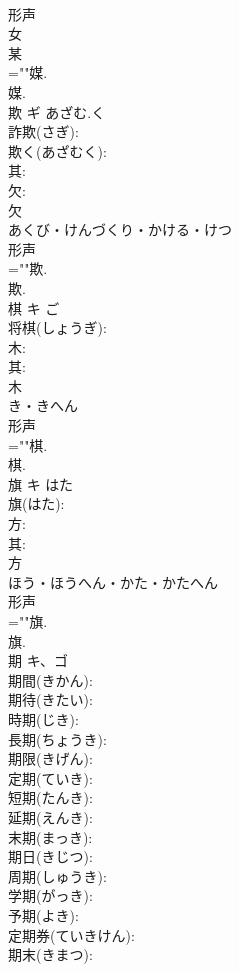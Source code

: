 \documentclass[8pt]{extreport}
\begin{document}
\begin{CJK}{UTF8}{min}
\\	形声 
\\	女 
\\	某
\\	=""媒.
\\	媒.
\\	欺	ギ	あざむ.く		
\\	詐欺(さぎ): 
\\	欺く(あざむく): 
\\	其: 
\\	欠: 
\\	欠	
\\	あくび・けんづくり・かける・けつ	
\\	形声 
\\	=""欺.
\\	欺.
\\	棋	キ	ご		
\\	将棋(しょうぎ): 
\\	木: 
\\	其: 
\\	木	
\\	き・きへん	
\\	形声 
\\	=""棋.
\\	棋.
\\	旗	キ	はた		
\\	旗(はた): 
\\	方: 
\\	其: 
\\	方	
\\	ほう・ほうへん・かた・かたへん	
\\	形声 
\\	=""旗.
\\	旗.
\\	期	キ、ゴ			
\\	期間(きかん): 
\\	期待(きたい): 
\\	時期(じき): 
\\	長期(ちょうき): 
\\	期限(きげん): 
\\	定期(ていき): 
\\	短期(たんき): 
\\	延期(えんき): 
\\	末期(まっき): 
\\	期日(きじつ): 
\\	周期(しゅうき): 
\\	学期(がっき): 
\\	予期(よき): 
\\	定期券(ていきけん): 
\\	期末(きまつ): 

\end{CJK}
\end{document}

